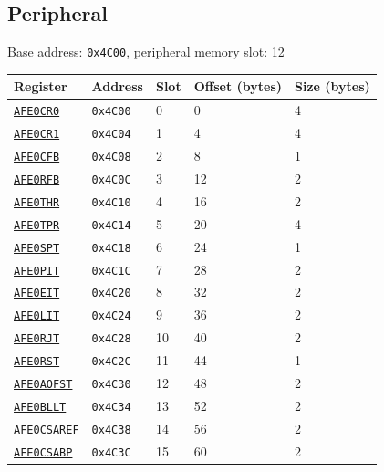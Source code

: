 \subsection{ Peripheral}
\noindent Base address: \texttt{0x4C00}, peripheral memory slot: 12

\begin{tabularx}{\textwidth}{ l l l l X }
\textbf{Register} & \textbf{Address} & \textbf{Slot} & \textbf{Offset (bytes)} & \textbf{Size (bytes)} \\ \hline
\hyperref[ss:AFExCR0]{\texttt{AFE0CR0}} & \texttt{0x4C00} & 0 & 0 & 4 \\
\rowcolor{tablehighlightcolor} \hyperref[ss:AFExCR1]{\texttt{AFE0CR1}} & \texttt{0x4C04} & 1 & 4 & 4 \\
\hyperref[ss:AFExCFB]{\texttt{AFE0CFB}} & \texttt{0x4C08} & 2 & 8 & 1 \\
\rowcolor{tablehighlightcolor} \hyperref[ss:AFExRFB]{\texttt{AFE0RFB}} & \texttt{0x4C0C} & 3 & 12 & 2 \\
\hyperref[ss:AFExTHR]{\texttt{AFE0THR}} & \texttt{0x4C10} & 4 & 16 & 2 \\
\rowcolor{tablehighlightcolor} \hyperref[ss:AFExTPR]{\texttt{AFE0TPR}} & \texttt{0x4C14} & 5 & 20 & 4 \\
\hyperref[ss:AFExSPT]{\texttt{AFE0SPT}} & \texttt{0x4C18} & 6 & 24 & 1 \\
\rowcolor{tablehighlightcolor} \hyperref[ss:AFExPIT]{\texttt{AFE0PIT}} & \texttt{0x4C1C} & 7 & 28 & 2 \\
\hyperref[ss:AFExEIT]{\texttt{AFE0EIT}} & \texttt{0x4C20} & 8 & 32 & 2 \\
\rowcolor{tablehighlightcolor} \hyperref[ss:AFExLIT]{\texttt{AFE0LIT}} & \texttt{0x4C24} & 9 & 36 & 2 \\
\hyperref[ss:AFExRJT]{\texttt{AFE0RJT}} & \texttt{0x4C28} & 10 & 40 & 2 \\
\rowcolor{tablehighlightcolor} \hyperref[ss:AFExRST]{\texttt{AFE0RST}} & \texttt{0x4C2C} & 11 & 44 & 1 \\
\hyperref[ss:AFExAOFST]{\texttt{AFE0AOFST}} & \texttt{0x4C30} & 12 & 48 & 2 \\
\rowcolor{tablehighlightcolor} \hyperref[ss:AFExBLLT]{\texttt{AFE0BLLT}} & \texttt{0x4C34} & 13 & 52 & 2 \\
\hyperref[ss:AFExCSAREF]{\texttt{AFE0CSAREF}} & \texttt{0x4C38} & 14 & 56 & 2 \\
\rowcolor{tablehighlightcolor} \hyperref[ss:AFExCSABP]{\texttt{AFE0CSABP}} & \texttt{0x4C3C} & 15 & 60 & 2 \\

\end{tabularx}
